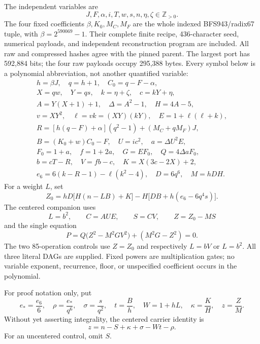The independent variables are
\[
J,F,\alpha,i,T,w,s,n,\eta,\zeta\in\mathbb Z_{>0}.
\]
The four fixed coefficients \(\beta,K_0,M_C,M_F\) are the whole
indexed BFS943/radix67 tuple, with \(\beta=2^{590069}-1\).  Their complete
finite recipe, 436-character seed, numerical payloads, and independent
reconstruction program are included.  All raw and compressed hashes agree
with the pinned parent.  The largest port has 592,884 bits; the four raw
payloads occupy 295,388 bytes.  Every symbol below is a polynomial
abbreviation, not another quantified variable:
\begin{gather*}
h=\beta J,\quad q=h+1,\quad C_0=q-F-\alpha,\\
X=qw,\quad Y=qs,\quad k=\eta+\zeta,\quad c=kY+\eta,\\
A=Y(X+1)+1,\quad \Delta=A^2-1,\quad H=4A-5,\\
v=XY^2,\quad \ell=vk=(XY)(kY),\quad E=1+\ell(\ell+k),\\
R=[h(q-F)+\alpha](q^2-1)+(M_C+qM_F)J,\\
B=(K_0+w)C_0-F,\quad U=ic^2,\quad a=\Delta U^2E,\\
F_0=1+a,\quad f=1+2a,\quad G=EF_0,\quad Q=4\Delta aF_0,\\
b=cT-R,\quad V=fb-c,\quad K=X(3c-2X)+2,\\
e_6=6(k-R-1)-\ell(k^2-4),\quad D=6q^6,\quad M=hDH.
\end{gather*}
For a weight \(L\), set
\[
Z_0=hD\bigl[H(n-LB)+K\bigr]-H\bigl[DB+h(e_6-6q^4s)\bigr].
\]
The centered companion uses
\[
L=b^2,\qquad C=AUE,\qquad S=CV,\qquad Z=Z_0-MS
\]
and the single equation
\begin{equation}
\boxed{\ P=Q\bigl(Z^2-M^2GV^2\bigr)+(M^2G-Z^2)=0.\ }
\label{eq:compact-centered}
\end{equation}
The two 85-operation controls use \(Z=Z_0\) and respectively
\(L=bV\) or \(L=b^2\).  All three literal DAGs are supplied.  Fixed
powers are multiplication gates; no variable exponent, recurrence, floor,
or unspecified coefficient occurs in the polynomial.

For proof notation only, put
\[
e_*=\frac{e_6}{6},\quad \rho=\frac{e_*}{q^6},\quad
\sigma=\frac{s}{q^2},\quad t=\frac{B}{h},\quad W=1+hL,
\quad\kappa=\frac{K}{H},\quad z=\frac{Z}{M}.
\]
Without yet asserting integrality, the centered carrier identity is
\begin{equation}
z=n-S+\kappa+\sigma-Wt-\rho.
\label{eq:compact-carrier}
\end{equation}
For an uncentered control, omit \(S\).


